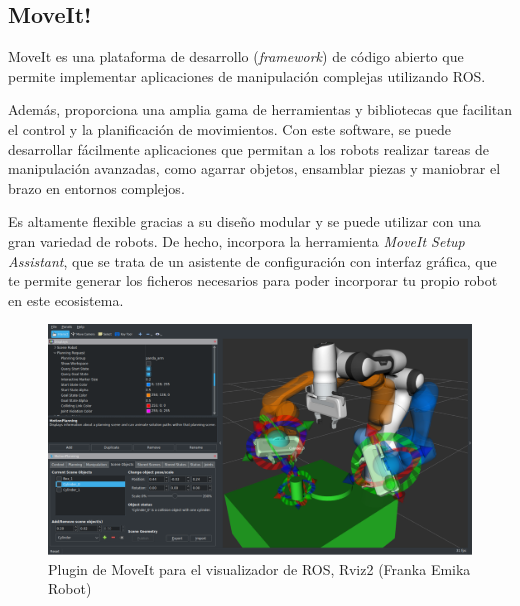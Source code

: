 \subsection{MoveIt!}
\label{subsec:moveit}
\noindent MoveIt es una plataforma de desarrollo (\textit{framework}) de código abierto que permite implementar 
aplicaciones de manipulación complejas utilizando ROS. 

Además, proporciona una amplia gama de herramientas y bibliotecas que 
facilitan el control y la planificación de movimientos. Con este software, se puede desarrollar fácilmente aplicaciones que permitan
a los robots realizar tareas de manipulación avanzadas, como agarrar objetos, ensamblar piezas y maniobrar el brazo en entornos complejos. 

Es altamente flexible gracias a su diseño modular y se puede utilizar con una gran variedad de robots. De hecho, incorpora la herramienta 
\textit{MoveIt Setup Assistant}, que se trata de un asistente de configuración con interfaz gráfica, que te permite generar los ficheros 
necesarios para poder incorporar tu propio robot en este ecosistema. 
\begin{figure} [h!]
  \begin{center}
    \includegraphics[width=14cm]{figs/moveit_intro.png}
  \end{center}
  \caption{Plugin de MoveIt para el visualizador de ROS, Rviz2 (Franka Emika Robot)}
  \label{fig:ros2logo}
\end{figure}\ 

\newpage
